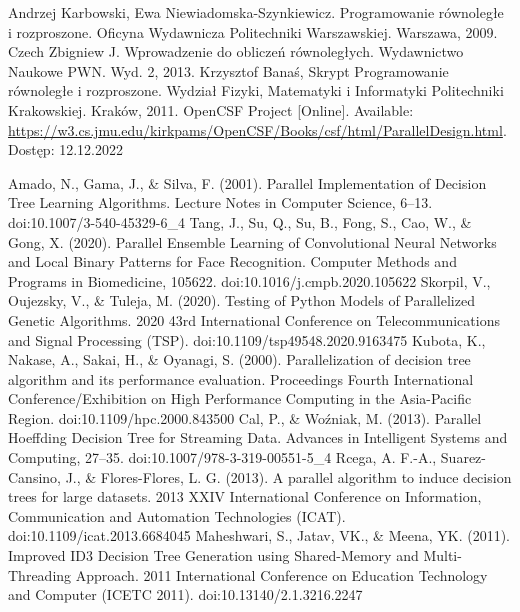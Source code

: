 \documentclass[12pt]{article}
\begin{document}
\begin{thebibliography}{6}

     Andrzej Karbowski, Ewa Niewiadomska-Szynkiewicz. Programowanie równoległe i rozproszone. Oficyna Wydawnicza Politechniki Warszawskiej. Warszawa, 2009.
     Czech Zbigniew J. Wprowadzenie do obliczeń równoległych. Wydawnictwo Naukowe PWN. Wyd. 2, 2013.
     Krzysztof Banaś, Skrypt Programowanie równoległe i rozproszone. Wydział Fizyki, Matematyki i Informatyki Politechniki Krakowskiej. Kraków, 2011.
     OpenCSF Project [Online]. Available: \url{https://w3.cs.jmu.edu/kirkpams/OpenCSF/Books/csf/html/ParallelDesign.html}. Dostęp: 12.12.2022

     Amado, N., Gama, J., \& Silva, F. (2001). Parallel Implementation of Decision Tree Learning Algorithms. Lecture Notes in Computer Science, 6–13. doi:10.1007/3-540-45329-6\_4 
     Tang, J., Su, Q., Su, B., Fong, S., Cao, W., \& Gong, X. (2020). Parallel Ensemble Learning of Convolutional Neural Networks and Local Binary Patterns for Face Recognition. Computer Methods and Programs in Biomedicine, 105622. doi:10.1016/j.cmpb.2020.105622
     Skorpil, V., Oujezsky, V., \& Tuleja, M. (2020). Testing of Python Models of Parallelized Genetic Algorithms. 2020 43rd International Conference on Telecommunications and Signal Processing (TSP). doi:10.1109/tsp49548.2020.9163475
     Kubota, K., Nakase, A., Sakai, H., \& Oyanagi, S. (2000). Parallelization of decision tree algorithm and its performance evaluation. Proceedings Fourth International Conference/Exhibition on High Performance Computing in the Asia-Pacific Region. doi:10.1109/hpc.2000.843500
     Cal, P., \& Woźniak, M. (2013). Parallel Hoeffding Decision Tree for Streaming Data. Advances in Intelligent Systems and Computing, 27–35. doi:10.1007/978-3-319-00551-5\_4
     Rcega, A. F.-A., Suarez-Cansino, J., \& Flores-Flores, L. G. (2013). A parallel algorithm to induce decision trees for large datasets. 2013 XXIV International Conference on Information, Communication and Automation Technologies (ICAT). doi:10.1109/icat.2013.6684045 
     Maheshwari, S., Jatav, VK., \& Meena, YK. (2011). Improved ID3 Decision Tree Generation using Shared-Memory and Multi-Threading Approach. 2011 International Conference on Education Technology and Computer (ICETC 2011). doi:10.13140/2.1.3216.2247

\end{thebibliography}
\end{document}
